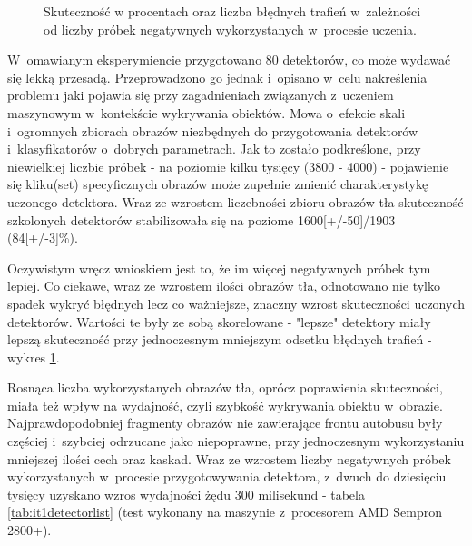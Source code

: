 \begin{figure}[h!]
	\begin{center}
	\end{center}
	\caption{Skuteczność w procentach oraz liczba błędnych trafień
		w~zależności od liczby próbek negatywnych wykorzystanych 
		w~procesie uczenia.}
	\label{chart:5000to2000_10000neg}
\end{figure}

W~omawianym eksperymiencie przygotowano 80 detektorów, co może wydawać
się lekką przesadą. Przeprowadzono go jednak i~opisano w~celu nakreślenia
problemu jaki pojawia się przy zagadnieniach związanych
z~uczeniem maszynowym
w~kontekście wykrywania obiektów. Mowa o~efekcie skali 
i~ogromnych zbiorach obrazów niezbędnych do przygotowania
detektorów i~klasyfikatorów o~dobrych parametrach. 
Jak to zostało podkreślone, przy niewielkiej liczbie próbek - na poziomie kilku tysięcy 
(3800 - 4000) - pojawienie się kliku(set)
specyficznych obrazów może
zupełnie zmienić charakterystykę uczonego detektora. Wraz ze wzrostem liczebności zbioru
obrazów tła skuteczność szkolonych detektorów stabilizowała się na poziome 1600[+/-50]/1903
(84[+/-3]\%).

Oczywistym wręcz wnioskiem jest to, że im więcej negatywnych próbek tym lepiej.
Co ciekawe, wraz ze wzrostem ilości obrazów tła, odnotowano nie tylko spadek 
wykryć błędnych lecz
co ważniejsze, znaczny wzrost skuteczności uczonych detektorów. Wartości te były ze sobą
skorelowane - "lepsze" detektory miały lepszą skuteczność przy jednoczesnym mniejszym
odsetku błędnych trafień - wykres \ref{chart:5000to2000_10000neg}.

Rosnąca liczba wykorzystanych obrazów tła, oprócz poprawienia skuteczności, miała
też wpływ na wydajność, czyli szybkość wykrywania obiektu w~obrazie. Najprawdopodobniej
fragmenty obrazów nie zawierające frontu autobusu były częściej i~szybciej odrzucane jako
niepoprawne, przy jednoczesnym wykorzystaniu mniejszej ilości cech oraz kaskad.
Wraz ze wzrostem liczby negatywnych próbek wykorzystanych w~procesie przygotowywania
detektora, z~dwuch do dziesięciu tysięcy uzyskano wzros wydajności żędu 300 milisekund - 
tabela \ref{tab:it1detectorlist} (test wykonany na maszynie z~procesorem AMD Sempron 2800+).

